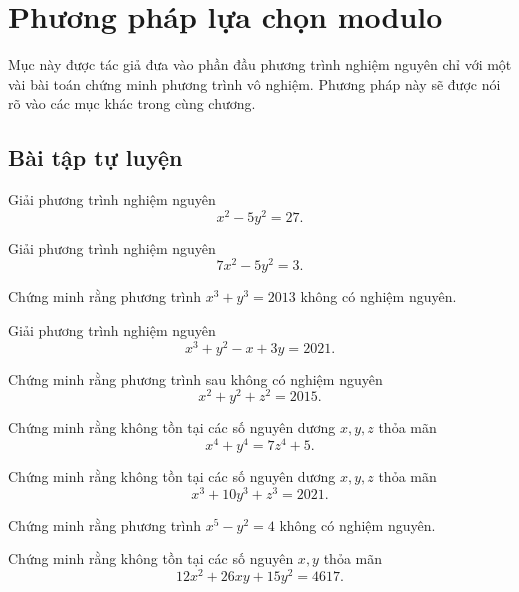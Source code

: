 \section{Phương pháp lựa chọn modulo}

Mục này được tác giả đưa vào phần đầu phương trình nghiệm nguyên chỉ với một vài bài toán chứng minh phương trình vô nghiệm. Phương pháp này sẽ được nói rõ vào các mục khác trong cùng chương.


\subsection*{Bài tập tự luyện}

\begin{btt}
Giải phương trình nghiệm nguyên $$x^2-5y^2= 27.$$
\end{btt}

\begin{btt}
Giải phương trình nghiệm nguyên $$7x^2-5y^2=3.$$
\end{btt}

\begin{btt}
Chứng minh rằng phương trình $x^3+y^3=2013$ không có nghiệm nguyên.
\end{btt}

\begin{btt}
Giải phương trình nghiệm nguyên $$x^3+y^2-x+3y=2021.$$
\end{btt}

\begin{btt}
Chứng minh rằng phương trình sau không có nghiệm nguyên \[x^2+y^2+z^2=2015.\]
\end{btt}

\begin{btt}
Chứng minh rằng không tồn tại các số nguyên dương $x,y,z$ thỏa mãn \[x^4+y^4=7z^4+5.\] 
\end{btt}

\begin{btt}
Chứng minh rằng không tồn tại các số nguyên dương $x,y,z$ thỏa mãn
\[x^3+10y^3+z^3=2021.\]
\end{btt}

\begin{btt}
Chứng minh rằng phương trình $x^5-y^2=4$ không có nghiệm nguyên.
\end{btt}

\begin{btt}
Chứng minh rằng không tồn tại các số nguyên $x,y$ thỏa mãn
\[12x^2+26xy+15y^2=4617.\]
\end{btt}

